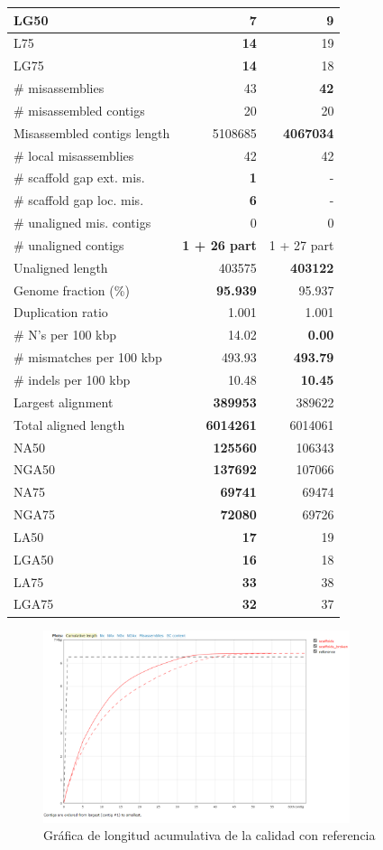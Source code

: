 \documentclass[journal, letterpaper, 11pt]{IEEEtran}
\begin{document}
\begin{table}[H]
\begin{center}
\begin{tabular}{|l*{2}{|r}|}
LG50 & {\bf 7} & 9 \\ \hline
L75 & {\bf 14} & 19 \\ \hline
LG75 & {\bf 14} & 18 \\ \hline
\# misassemblies & 43 & {\bf 42} \\ \hline
\# misassembled contigs & 20 & 20 \\ \hline
Misassembled contigs length & 5108685 & {\bf 4067034} \\ \hline
\# local misassemblies & 42 & 42 \\ \hline
\# scaffold gap ext. mis. & {\bf 1} & - \\ \hline
\# scaffold gap loc. mis. & {\bf 6} & - \\ \hline
\# unaligned mis. contigs & 0 & 0 \\ \hline
\# unaligned contigs & {\bf 1 + 26 part} & 1 + 27 part \\ \hline
Unaligned length & 403575 & {\bf 403122} \\ \hline
Genome fraction (\%) & {\bf 95.939} & 95.937 \\ \hline
Duplication ratio & 1.001 & 1.001 \\ \hline
\# N's per 100 kbp & 14.02 & {\bf 0.00} \\ \hline
\# mismatches per 100 kbp & 493.93 & {\bf 493.79} \\ \hline
\# indels per 100 kbp & 10.48 & {\bf 10.45} \\ \hline
Largest alignment & {\bf 389953} & 389622 \\ \hline
Total aligned length & {\bf 6014261} & 6014061 \\ \hline
NA50 & {\bf 125560} & 106343 \\ \hline
NGA50 & {\bf 137692} & 107066 \\ \hline
NA75 & {\bf 69741} & 69474 \\ \hline
NGA75 & {\bf 72080} & 69726 \\ \hline
LA50 & {\bf 17} & 19 \\ \hline
LGA50 & {\bf 16} & 18 \\ \hline
LA75 & {\bf 33} & 38 \\ \hline
LGA75 & {\bf 32} & 37 \\ \hline
\end{tabular}
\end{center}
\end{table}

\begin{figure}[H]
\centering
\includegraphics[width=9cm]{imagenes/mapeocon.png}
\caption{Gráfica de longitud acumulativa de la calidad con referencia}
\end{figure}
\end{document}
